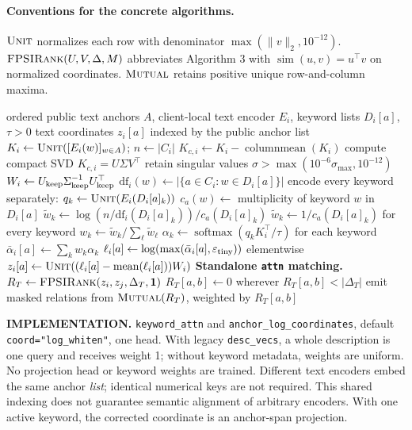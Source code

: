 \documentclass[11pt]{article}
\newcommand{\mutual}{\textsc{Mutual}}
\newcommand{\unit}{\textsc{Unit}}
\newcommand{\fprank}{\textsc{FPSIRank}}
\begin{document}
\paragraph{Conventions for the concrete algorithms.}
$\unit$ normalizes each row with denominator
$\max(\|v\|_2,10^{-12})$.
$\fprank(U,V,\Delta,M)$ abbreviates Algorithm 3 with
$\operatorname{sim}(u,v)=u^\top v$ on normalized coordinates.
$\mutual$ retains positive unique row-and-column maxima.
\begin{algorithm}[H]
\caption{Keyword-attention representation and standalone matching}
\label{alg:a3b}
\footnotesize\begin{algorithmic}[1]
\Require ordered public text anchors $A$, client-local text encoder $E_i$, keyword lists $D_i[a]$, $\tau>0$
\Ensure text coordinates $z_i[a]$ indexed by the public anchor list
 \State $K_i\gets\unit([E_i(w)]_{w\in A})$; $n\gets|C_i|$
 \State $K_{c,i}\gets K_i-\operatorname{columnmean}(K_i)$
 \State compute compact SVD $K_{c,i}=U\Sigma V^\top$
 \State retain singular values $\sigma>\max(10^{-6}\sigma_{\max},10^{-12})$
 \State $W_i\gets U_{\rm keep}\Sigma_{\rm keep}^{-1}U_{\rm keep}^\top$
 \State $\mathrm{df}_i(w)\gets|\{a\in C_i:w\in D_i[a]\}|$
  \State encode every keyword separately: $q_k\gets\unit(E_i(D_i[a]_k))$
  \State $c_a(w)\gets$ multiplicity of keyword $w$ in $D_i[a]$
  \State $\widetilde w_k\gets\log(n/\mathrm{df}_i(D_i[a]_k))/c_a(D_i[a]_k)$
   \State $\widetilde w_k\gets1/c_a(D_i[a]_k)$ for every keyword
  \EndIf
  \State $w_k\gets\widetilde w_k/\sum_\ell\widetilde w_\ell$
  \State $\alpha_k\gets\operatorname{softmax}(q_kK_i^\top/\tau)$ for each keyword
  \State $\bar\alpha_i[a]\gets\sum_k w_k\alpha_k$
  \State $\ell_i[a]\gets\log(\max(\bar\alpha_i[a],\varepsilon_{\rm tiny}))$ elementwise
  \State $z_i[a]\gets\unit((\ell_i[a]-\operatorname{mean}(\ell_i[a]))W_i)$
 \EndFor
\EndFor
\Statex \textbf{Standalone \texttt{attn} matching.}
 \State $R_T\gets\fprank(z_i,z_j,\Delta_T,\mathbf{1})$
 \State $R_T[a,b]\gets0$ wherever $R_T[a,b]<|\Delta_T|$
 \State emit masked relations from $\mutual(R_T)$, weighted by $R_T[a,b]$
\EndFor
\Statex \hrulefill
\Statex \raggedright\textbf{IMPLEMENTATION.} \texttt{keyword\_attn} and
\texttt{anchor\_log\_coordinates}, default \texttt{coord="log\_whiten"}, one head.
With legacy \texttt{desc\_vecs}, a whole description is one query and receives
weight 1; without keyword metadata, weights are uniform. No projection head or
keyword weights are trained. Different text encoders embed the same anchor
\emph{list}; identical numerical keys are not required. This shared indexing
does not guarantee semantic alignment of arbitrary encoders. With one active
keyword, the corrected coordinate is an anchor-span projection.
\end{algorithmic}\end{algorithm}
\clearpage
\end{document}
